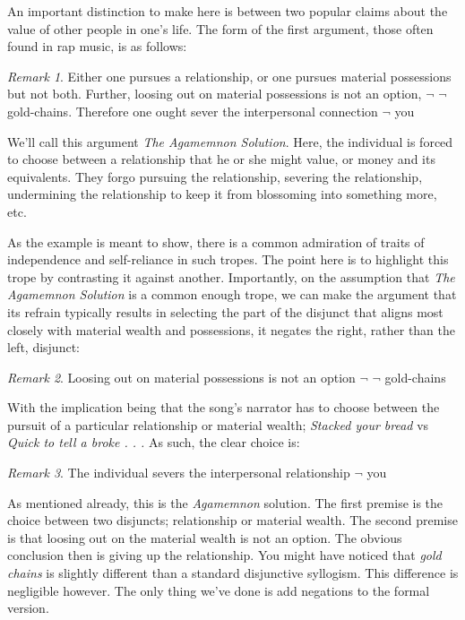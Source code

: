 \documentclass[
  12pt,
]{book}
\theoremstyle{definition}
\theoremstyle{definition}
\theoremstyle{definition}
\theoremstyle{definition}
\theoremstyle{remark}
\newtheorem*{remark}{Remark}
\begin{document}
An important distinction to make here is between two popular claims about the value of other people in one's life. The form of the first argument, those often found in rap music, is as follows:

\begin{remark}
Either one pursues a relationship, or one pursues material possessions but not both. Further, loosing out on material possessions is not an option, \(\lnot\) \(\lnot\) gold-chains. Therefore one ought sever the interpersonal connection \(\lnot\) you
\end{remark}

We'll call this argument \emph{The Agamemnon Solution}. Here, the individual is forced to choose between a relationship that he or she might value, or money and its equivalents. They forgo pursuing the relationship, severing the relationship, undermining the relationship to keep it from blossoming into something more, etc.

As the example is meant to show, there is a common admiration of traits of independence and self-reliance in such tropes. The point here is to highlight this trope by contrasting it against another. Importantly, on the assumption that \emph{The Agamemnon Solution} is a common enough trope, we can make the argument that its refrain typically results in selecting the part of the disjunct that aligns most closely with material wealth and possessions, it negates the right, rather than the left, disjunct:

\begin{remark}
Loosing out on material possessions is not an option \(\lnot\) \(\lnot\) gold-chains
\end{remark}

With the implication being that the song's narrator has to choose between the pursuit of a particular relationship or material wealth; \emph{Stacked your bread} vs \emph{Quick to tell a broke . . .} As such, the clear choice is:

\begin{remark}
The individual severs the interpersonal relationship \(\lnot\) you
\end{remark}

As mentioned already, this is the \emph{Agamemnon} solution. The first premise is the choice between two disjuncts; relationship or material wealth. The second premise is that loosing out on the material wealth is not an option. The obvious conclusion then is giving up the relationship. You might have noticed that \emph{gold chains} is slightly different than a standard disjunctive syllogism. This difference is negligible however. The only thing we've done is add negations to the formal version.
\end{document}
